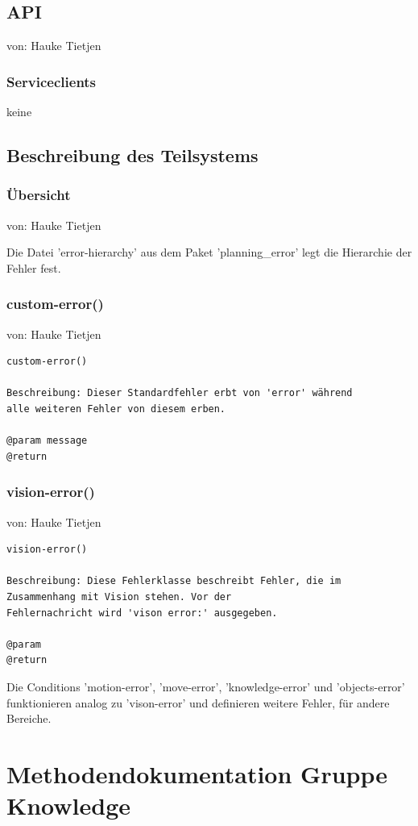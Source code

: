 \documentclass{suturo}
\makeatletter
\newcommand{\chapterauthor}[1]{%
  {\parindent0pt\vspace*{-27pt}%
  \linespread{0}\small\begin{flushright}von: #1\end{flushright}%
  \par\nobreak\vspace*{0pt}}
  \@afterheading%
}
\makeatother
\begin{document}
\subsection{API}
\chapterauthor{Hauke Tietjen}
\subsubsection{Serviceclients}
keine
\subsection{Beschreibung des Teilsystems}
\subsubsection{\"Ubersicht}
\chapterauthor{Hauke Tietjen}
Die Datei 'error-hierarchy' aus dem Paket 'planning\_error' legt die Hierarchie der Fehler fest.

\subsubsection{custom-error()}
\chapterauthor{Hauke Tietjen}
\begin{verbatim}
custom-error()

Beschreibung: Dieser Standardfehler erbt von 'error' während
alle weiteren Fehler von diesem erben. 

@param message
@return 
\end{verbatim}

\subsubsection{vision-error()}
\chapterauthor{Hauke Tietjen}
\begin{verbatim}
vision-error()

Beschreibung: Diese Fehlerklasse beschreibt Fehler, die im
Zusammenhang mit Vision stehen. Vor der 
Fehlernachricht wird 'vison error:' ausgegeben. 

@param
@return 
\end{verbatim}

Die Conditions 'motion-error', 'move-error', 'knowledge-error' und 'objects-error' funktionieren analog zu 'vison-error' und definieren weitere Fehler, für andere Bereiche.


\newpage
\section*{Methodendokumentation Gruppe Knowledge}
\end{document}
